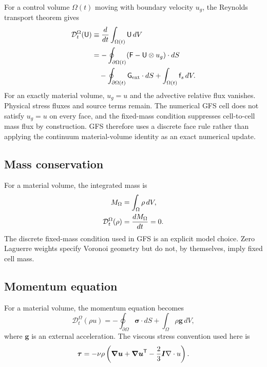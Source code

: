 \documentclass[twocolumn]{aastex63}
\newcommand{\vel}{{u}}
\newcommand{\surf}[0]{S}
\newcommand{\gradT}[1]{\boldsymbol{\nabla#1}}
\begin{document}
For a control volume $\Omega(t)$ moving with boundary velocity $\vel_g$,
the Reynolds transport theorem gives
\begin{equation}\label{lag}
  \begin{aligned}
  \mathcal{D}_t^\Omega(\mathsf{U})
  &\equiv {d\over dt}\int_{\Omega(t)}\mathsf{U}\,dV\\
  &=-\oint_{\partial\Omega(t)}
    (\mathsf{F}-\mathsf{U}\otimes\vel_g)\cdot d\surf\\
  &\quad-\oint_{\partial\Omega(t)}\mathsf{G}_\textrm{ext}\cdot d\surf
   +\int_{\Omega(t)}\mathsf{f}_s\,dV.
  \end{aligned}
\end{equation}
For an exactly material volume, $\vel_g=\vel$ and the advective relative
flux vanishes. Physical stress fluxes and source terms remain. The numerical
GFS cell does not satisfy $\vel_g=\vel$ on every face, and the fixed-mass
condition suppresses cell-to-cell mass flux by construction. GFS therefore
uses a discrete face rule rather than applying the continuum material-volume
identity as an exact numerical update.

\subsection{Mass conservation}
For a material volume, the integrated mass is
\begin{equation}
  \begin{aligned}
  M_\Omega&=\int_\Omega\rho\,dV,\\
  \mathcal{D}_t^\Omega(\rho)&={dM_\Omega\over dt}=0.
  \end{aligned}
\end{equation}
The discrete fixed-mass condition used in GFS is an explicit model choice.
Zero Laguerre weights specify Voronoi geometry but do not, by themselves,
imply fixed cell mass.

\subsection{Momentum equation}
For a material volume, the momentum equation becomes
\begin{equation}
  \mathcal{D}_t^\Omega(\rho\vel)
  =-\oint_{\partial\Omega}\boldsymbol{\sigma}\cdot d\surf
   +\int_\Omega\rho\boldsymbol{g}\,dV,
\end{equation}
where $\boldsymbol{g}$ is an external acceleration. The viscous stress
convention used here is
\begin{equation}\label{eq:tau}
  \boldsymbol{\tau}
  =-\nu\rho\left(\gradT{\vel}+\gradT{\vel}^{\mathsf{T}}
    -{2\over3}\boldsymbol{I}\nabla\cdot\vel\right).
\end{equation}
\end{document}
